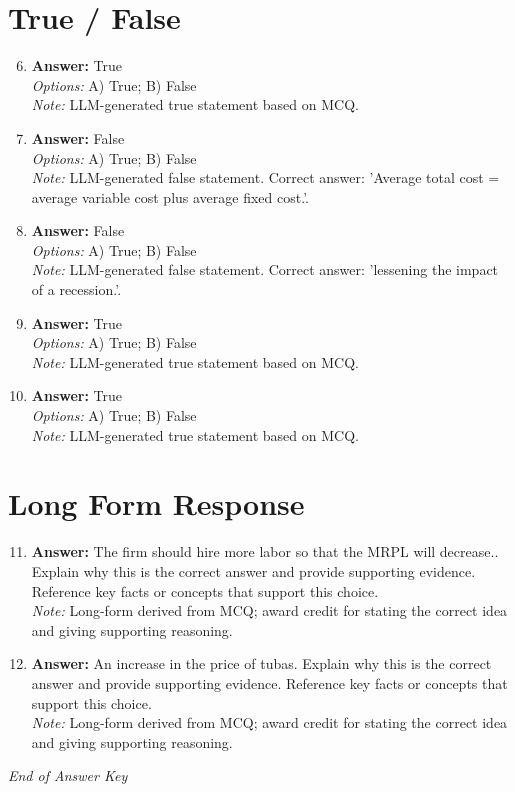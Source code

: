 \documentclass[12pt]{article}
\begin{document}
\section*{True / False}
\begin{enumerate}[label=\arabic*.]
\setcounter{enumi}{5}
\item \textbf{Answer:} True
\\ \textit{Options:} A) True; B) False
\\ \textit{Note:} LLM-generated true statement based on MCQ.
\item \textbf{Answer:} False
\\ \textit{Options:} A) True; B) False
\\ \textit{Note:} LLM-generated false statement. Correct answer: 'Average total cost = average variable cost plus average fixed cost.'.
\item \textbf{Answer:} False
\\ \textit{Options:} A) True; B) False
\\ \textit{Note:} LLM-generated false statement. Correct answer: 'lessening the impact of a recession.'.
\item \textbf{Answer:} True
\\ \textit{Options:} A) True; B) False
\\ \textit{Note:} LLM-generated true statement based on MCQ.
\item \textbf{Answer:} True
\\ \textit{Options:} A) True; B) False
\\ \textit{Note:} LLM-generated true statement based on MCQ.
\end{enumerate}

\section*{Long Form Response}
\begin{enumerate}[label=\arabic*.]
\setcounter{enumi}{10}
\item \textbf{Answer:} The firm should hire more labor so that the MRPL will decrease.. Explain why this is the correct answer and provide supporting evidence. Reference key facts or concepts that support this choice.
\\ \textit{Note:} Long-form derived from MCQ; award credit for stating the correct idea and giving supporting reasoning.
\item \textbf{Answer:} An increase in the price of tubas. Explain why this is the correct answer and provide supporting evidence. Reference key facts or concepts that support this choice.
\\ \textit{Note:} Long-form derived from MCQ; award credit for stating the correct idea and giving supporting reasoning.
\end{enumerate}

\vfill
\noindent\textit{End of Answer Key}
\end{document}
